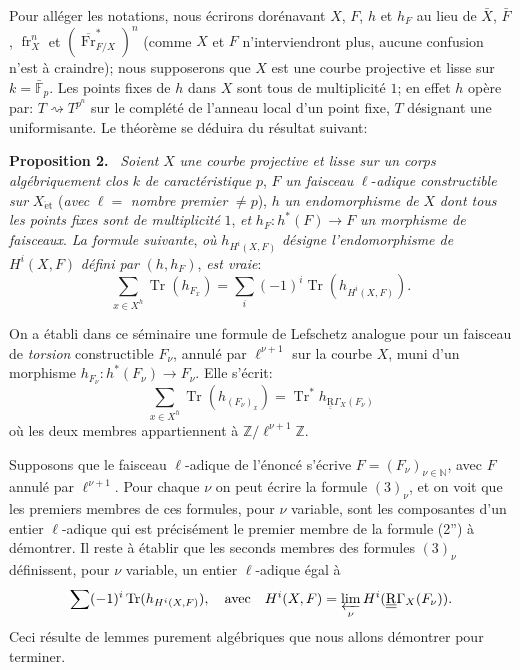 \documentclass[11pt]{article}
\newenvironment{statement}[1]{\par\medskip\noindent\textbf{#1.}\ }{\par\medskip}
\providecommand{\et}{\mathrm{\acute{e}t}}
\providecommand{\Tr}{\operatorname{Tr}}
\providecommand{\Tr}{\operatorname{Tr}}
\providecommand{\Tr}{\operatorname{Tr}}
\providecommand{\Tr}{\operatorname{Tr}}
\providecommand{\Tr}{\operatorname{Tr}}
\providecommand{\fr}{\operatorname{fr}}
\providecommand{\Fr}{\operatorname{Fr}}
\providecommand{\Fr}{\operatorname{Fr}}
\providecommand{\fr}{\operatorname{fr}}
\providecommand{\et}{\acute{e}t}
\begin{document}
Pour alléger les notations, nous écrirons dorénavant $X$, $F$, $h$ et $h_F$ au lieu de $\bar X$, $\bar F$, $\fr_X^n$ et $(\overline{\Fr}^*_{F/X})^n$ (comme $X$ et $F$ n'interviendront plus, aucune confusion n'est à craindre); nous supposerons que $X$ est une courbe projective et lisse sur $k=\bar{\mathbb F}_p$. Les points fixes de $h$ dans $X$ sont tous de multiplicité $1$; en effet $h$ opère par: $T\rightsquigarrow T^{p^n}$ sur le complété de l'anneau local d'un point fixe, $T$ désignant une uniformisante. Le théorème se déduira du résultat suivant:

\begin{statement}{Proposition 2}
\emph{Soient} $X$ \emph{une courbe projective et lisse sur un corps algébriquement clos} $k$ \emph{de caractéristique} $p$, $F$ \emph{un faisceau}
$\ell$-\emph{adique constructible sur} $X_{\et}$ (\emph{avec} $\ell=$ \emph{nombre premier} $\ne p$), $h$ \emph{un endomorphisme de} $X$ \emph{dont tous les points fixes sont de multiplicité} $1$, \emph{et} $h_F:h^*(F)\to F$ \emph{un morphisme de faisceaux}. \emph{La formule suivante}, \emph{où} $h_{H^i(X,F)}$ \emph{désigne l'endomorphisme de} $H^i(X,F)$ \emph{défini par} $(h,h_F)$, \emph{est vraie}:
\[
\sum_{x\in X^h}\Tr(h_{F_x})=\sum_i(-1)^i\Tr(h_{H^i(X,F)}).
\tag{2''}
\]
\end{statement}

On a établi dans ce séminaire une formule de Lefschetz analogue pour un faisceau de \emph{torsion} constructible $F_\nu$, annulé par $\ell^{\nu+1}$ sur la courbe $X$, muni d'un morphisme $h_{F_\nu}:h^*(F_\nu)\to F_\nu$. Elle s'écrit:
\[
\sum_{x\in X^h}\Tr(h_{(F_\nu)_x})=\Tr^*h_{\underline{\underline{\mathrm{R}}}\Gamma_X(F_\nu)}
\tag{3}
\]
où les deux membres appartiennent à $\mathbb Z/\ell^{\nu+1}\mathbb Z$.

Supposons que le faisceau $\ell$-adique de l'énoncé s'écrive $F=(F_\nu)_{\nu\in\mathbb N}$, avec $F$ annulé par $\ell^{\nu+1}$. Pour chaque $\nu$ on peut écrire la formule $(3)_\nu$, et on voit que les premiers membres de ces formules, pour $\nu$ variable, sont les composantes d'un entier $\ell$-adique qui est précisément le premier membre de la formule (2'') à démontrer. Il reste à établir que les seconds membres des formules $(3)_\nu$ définissent, pour $\nu$ variable, un entier $\ell$-adique égal à
\[
\sum(-1)^i\Tr(h_{H^i(X,F)}),
\quad\text{avec}\quad
H^i(X,F)=\varprojlim_\nu H^i(\underline{\underline{\mathrm{R}}}\Gamma_X(F_\nu)).
\]
Ceci résulte de lemmes purement algébriques que nous allons démontrer pour terminer.
\end{document}
